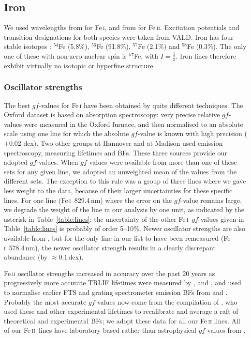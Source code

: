 \documentclass[traditabstract]{aa}
\newcommand{\altfei}{Fe\,\textsc{i}}
\newcommand{\altfeii}{Fe\,\textsc{ii}}
\newcommand{\fei}{\altfei\ }
\begin{document}
\subsection{Iron}
\label{Featomicdata}

We used wavelengths from \citet{Nave94} for Fe\,\textsc{i}, and from \citet{2013ApJS..204....1N} for Fe\,\textsc{ii}.  Excitation potentials and transition designations for both species were taken from VALD.  Iron has four stable isotopes \citep{IUPAC98}: $^{54}$Fe (5.8\%), $^{56}$Fe (91.8\%), $^{57}$Fe (2.1\%) and $^{58}$Fe (0.3\%).  The only one of these
with non-zero nuclear spin is $^{57}$Fe, with $I=\frac{1}{2}$.  Iron lines therefore exhibit virtually no isotopic or
hyperfine structure.

\subsubsection{Oscillator strengths}
\label{Fegfs}

The best $gf$-values for Fe\,\textsc{i} have been obtained by quite different techniques. The Oxford dataset \citep[see][and references therein]{Oxford6} is based on absorption spectroscopy: very precise relative $gf$-values were measured in the Oxford furnace, and then normalised to an absolute scale using one line for which the absolute $gf$-value is known with high precision ($\pm$0.02 dex). Two other groups at Hannover \citep{Bard91,Bard94} and at Madison \citep{OBrian91} used emission spectroscopy, measuring lifetimes and BFs. These three sources provide our adopted $gf$-values. When $gf$-values were available from more than one of these sets for any given line, we adopted an unweighted mean of the values from the different sets.  The exception to this rule was a group of three lines where we gave less weight to the \citet{OBrian91} data, because of their larger uncertainties for these specific lines. For one line (\fei 829.4\,nm) where the error on the $gf$-value remains large, we degrade the weight of the line in our analysis by one unit, as indicated by the asterisk in Table~\ref{table:lines}; the uncertainty of the other \fei $gf$-values given in Table~\ref{table:lines} is probably of order 5--10\%.  Newer oscillator strengths are also available from \citet{Ruffoni13}, but for the only line in our list to have been remeasured (\fei 578.4\,nm), the newer oscillator strength results in a clearly discrepant abundance (by $\approx$$0.1$\,dex).

Fe\,\textsc{ii} oscillator strengths increased in accuracy over the past 20 years as progressively more accurate TRLIF
lifetimes were measured by \citet{Hannaford92}, \citet{Schnabel99} and \citet{Schnabel04}, and used to normalise earlier
FTS and grating spectrometer emission BFs from \citet{Heise90} and \citet{Kroll87}.  Probably the most accurate $gf$-values now
come from the compilation of \citet{Melendez09}, who used these and other experimental lifetimes to recalibrate
and average a raft of theoretical and experimental BFs; we adopt these data for all our Fe\,\textsc{ii}
lines. All of our \altfeii\ lines have laboratory-based rather than astrophysical $gf$-values from \citet{Melendez09}. 
\end{document}
